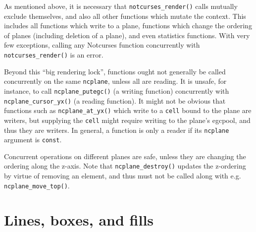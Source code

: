 \documentclass[letterpaper,10pt]{article}
\begin{document}
As mentioned above, it is necessary that \texttt{notcurses\_render()} calls
mutually exclude themselves, and also all other functions which mutate the
context. This includes all functions which write to a plane, functions which
change the ordering of planes (including deletion of a plane), and even
statistics functions. With very few exceptions, calling any Notcurses function
concurrently with \texttt{notcurses\_render()} is an error.

Beyond this ``big rendering lock'', functions ought not generally be called
concurrently on the same \texttt{ncplane}, unless all are reading. It is
unsafe, for instance, to call \texttt{ncplane\_putegc()} (a writing function)
concurrently with \texttt{ncplane\_cursor\_yx()} (a reading function). It
might not be obvious that functions such as \texttt{ncplane\_at\_yx()} which
write to a \texttt{cell} bound to the plane are writers, but supplying the
\texttt{cell} might require writing to the plane's egcpool, and thus they are
writers. In general, a function is only a reader if its \texttt{ncplane} argument
is \texttt{const}.

Concurrent operations on different planes are safe, unless they are changing
the ordering along the z-axis. Note that \texttt{ncplane\_destroy()} updates
the z-ordering by virtue of removing an element, and thus must not be called
along with e.g. \texttt{ncplane\_move\_top()}.

\cleardoublepage


\pagebreak
\cleardoublepage

\pagebreak
\cleardoublepage

\pagebreak
\cleardoublepage

\pagebreak
\cleardoublepage

\cleardoublepage


\cleardoublepage

\section{Lines, boxes, and fills}
\end{document}
